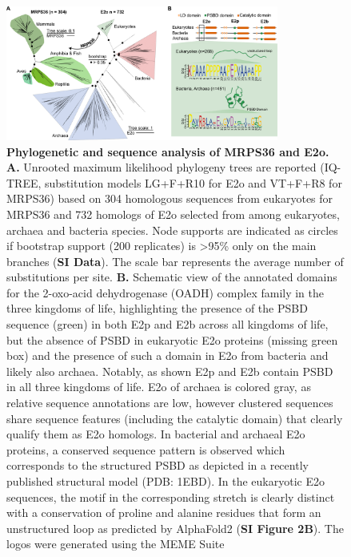 \documentclass[times, twoside]{zHenriquesLab-StyleBioRxiv}
\begin{document}
\begin{figure}[h]
    \centering
    \includegraphics[width=0.8\textwidth]{Figure3_new_mrps36_tree.png}
    \caption{\textbf{Phylogenetic and sequence analysis of MRPS36 and E2o.} \textbf{A.} Unrooted maximum likelihood phylogeny trees are reported (IQ-TREE, substitution models LG+F+R10 for E2o and VT+F+R8 for MRPS36) based on 304 homologous sequences from eukaryotes for MRPS36 and 732 homologs of E2o selected from among eukaryotes, archaea and bacteria species. Node supports are indicated as circles if bootstrap support (200 replicates) is >95\% only on the main branches (\textbf{SI Data}). The scale bar represents the average number of substitutions per site. \textbf{B.} Schematic view of the annotated domains for the 2-oxo-acid dehydrogenase (OADH) complex family in the three kingdoms of life, highlighting the presence of the PSBD sequence (green) in both E2p and E2b across all kingdoms of life, but the absence of PSBD in eukaryotic E2o proteins (missing green box) and the presence of such a domain in E2o from bacteria and likely also archaea. Notably, as shown E2p and E2b contain PSBD in all three kingdoms of life. E2o of archaea is colored gray, as relative sequence annotations are low, however clustered sequences share sequence features (including the catalytic domain) that clearly qualify them as E2o homologs. In bacterial and archaeal E2o proteins, a conserved sequence pattern is observed which corresponds to the structured PSBD as depicted in a recently published structural model \cite{Mande_1996} (PDB: 1EBD). In the eukaryotic E2o sequences, the motif in the corresponding stretch is clearly distinct with a conservation of proline and alanine residues that form an unstructured loop as predicted by AlphaFold2 (\textbf{SI Figure 2B}). The logos were generated using the MEME Suite \cite{Bailey_2015}}
    \label{fig:img1}
\end{figure}
\end{document}
